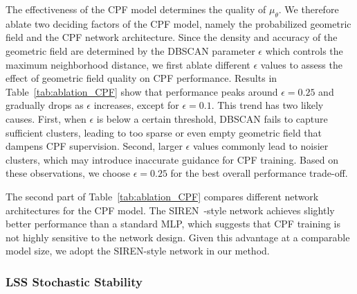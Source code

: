\documentclass[lettersize,journal]{IEEEtran}
\begin{document}
The effectiveness of the CPF model determines the quality of $\mu_{\theta}$. 
We therefore ablate two deciding factors of the CPF model, 
namely the probabilized geometric field and the CPF network architecture.
Since the density and accuracy of the geometric field are determined by the DBSCAN parameter $\epsilon$ which controls the maximum neighborhood distance, we first ablate different $\epsilon$ values to assess the effect of geometric field quality on CPF performance.
Results in Table~\ref{tab:ablation_CPF} show that performance peaks around $\epsilon = 0.25$ and gradually drops as $\epsilon$ increases, except for $\epsilon = 0.1$.
This trend has two likely causes.
First, when $\epsilon$ is below a certain threshold, DBSCAN fails to capture sufficient clusters, leading to too sparse or even empty geometric field that dampens CPF supervision.
Second, larger $\epsilon$ values commonly lead to noisier clusters, which may introduce inaccurate guidance for CPF training. 
Based on these observations, we choose $\epsilon = 0.25$ for the best overall performance trade-off.

The second part of Table~\ref{tab:ablation_CPF} compares different network architectures for the CPF model. The SIREN~\cite{implicit}-style network achieves slightly better performance than a standard MLP, which suggests that CPF training is not highly sensitive to the network design. Given this advantage at a comparable model size, we adopt the SIREN-style network in our method.


\subsubsection{LSS Stochastic Stability}

\begin{table}[h]
\centering
\caption{Results over five independent trials on Tanks \& Temples~\cite{tankstemples} with a 60$^\circ$ coverage gap.}
\label{tab:detailed_metrics}
\setlength{\tabcolsep}{4pt}
\end{table}
\end{document}
